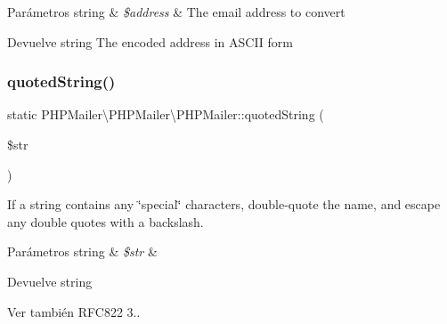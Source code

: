\begin{DoxyParams}[1]{Parámetros}
string & {\em \$address} & The email address to convert\\
\hline
\end{DoxyParams}
\begin{DoxyReturn}{Devuelve}
string The encoded address in A\+S\+C\+II form 
\end{DoxyReturn}
\mbox{\label{classPHPMailer_1_1PHPMailer_1_1PHPMailer_a91506be40a2d045a2429cb3c770fc921}} 
\subsubsection{\texorpdfstring{quoted\+String()}{quotedString()}}
{\footnotesize\ttfamily static P\+H\+P\+Mailer\textbackslash{}\+P\+H\+P\+Mailer\textbackslash{}\+P\+H\+P\+Mailer\+::quoted\+String (\begin{DoxyParamCaption}\item[{}]{\$str }\end{DoxyParamCaption})\hspace{0.3cm}{\ttfamily [static]}}

If a string contains any \char`\"{}special\char`\"{} characters, double-\/quote the name, and escape any double quotes with a backslash.


\begin{DoxyParams}[1]{Parámetros}
string & {\em \$str} & \\
\hline
\end{DoxyParams}
\begin{DoxyReturn}{Devuelve}
string
\end{DoxyReturn}
\begin{DoxySeeAlso}{Ver también}
R\+F\+C822 3.. 
\end{DoxySeeAlso}
\mbox{\label{classPHPMailer_1_1PHPMailer_1_1PHPMailer_a1c35f9ec17924309c683f123856866de}} 

